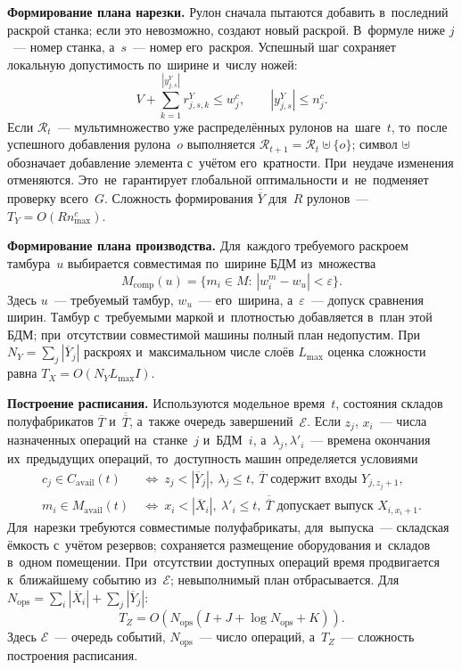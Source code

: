 \textbf{Формирование плана нарезки.} Рулон сначала пытаются добавить в~последний раскрой станка; если это невозможно, создают новый раскрой. В~формуле ниже $j$~--- номер станка, а~$s$~--- номер его~раскроя. Успешный шаг сохраняет локальную допустимость по~ширине и~числу ножей:
\[
V+\sum_{k=1}^{|y^Y_{j,s}|}r^Y_{j,s,k}\leq w^c_j,\qquad
|y^Y_{j,s}|\leq n^c_j.
\]
Если $\mathcal R_t$~--- мультимножество уже распределённых рулонов на~шаге~$t$, то~после успешного добавления рулона~$o$ выполняется $\mathcal R_{t+1}=\mathcal R_t\uplus\{o\}$; символ $\uplus$ обозначает добавление элемента с~учётом его~кратности. При~неудаче изменения отменяются. Это~не~гарантирует глобальной оптимальности и~не~подменяет проверку всего~$G$. Сложность формирования $\overline{\overline Y}$ для~$R$ рулонов~--- $T_Y=O(Rn^c_{\max})$.

\textbf{Формирование плана производства.} Для~каждого требуемого раскроем тамбура~$u$ выбирается совместимая по~ширине БДМ из~множества
\[
M_{\mathrm{comp}}(u)=
\{m_i\in M:\,|w_i^m-w_u|<\varepsilon\}.
\]
Здесь $u$~--- требуемый тамбур, $w_u$~--- его~ширина, а~$\varepsilon$~--- допуск сравнения ширин. Тамбур с~требуемыми маркой и~плотностью добавляется в~план этой БДМ; при~отсутствии совместимой машины полный план недопустим. При~$N_Y=\sum_j|\overline Y_j|$ раскроях и~максимальном числе слоёв $L_{\max}$ оценка сложности равна $T_X=O(N_YL_{\max}I)$.

\textbf{Построение расписания.} Используются модельное время~$t$, состояния складов полуфабрикатов $\overline T$ и~$\overline{\overline T}$, а~также очередь завершений~$\mathcal E$. Если $z_j$, $x_i$~--- числа назначенных операций на~станке~$j$ и~БДМ~$i$, а~$\lambda_j,\lambda'_i$~--- времена окончания их~предыдущих операций, то~доступность машин определяется условиями
\[
\begin{aligned}
c_j\in C_{\mathrm{avail}}(t)
&\ \Longleftrightarrow\
z_j<|\overline Y_j|,\ \lambda_j\leq t,\
\overline T\text{ содержит входы }Y_{j,z_j+1},\\
m_i\in M_{\mathrm{avail}}(t)
&\ \Longleftrightarrow\
x_i<|\overline X_i|,\ \lambda'_i\leq t,\
\overline{\overline T}\text{ допускает выпуск }X_{i,x_i+1}.
\end{aligned}
\]
Для~нарезки требуются совместимые полуфабрикаты, для~выпуска~--- складская ёмкость с~учётом резервов; сохраняется размещение оборудования и~складов в~одном помещении. При~отсутствии доступных операций время продвигается к~ближайшему событию из~$\mathcal E$; невыполнимый план отбрасывается. Для~$N_{\mathrm{ops}}=\sum_i|\overline X_i|+\sum_j|\overline Y_j|$:
\[
T_Z=O\!\left(N_{\mathrm{ops}}
(I+J+\log N_{\mathrm{ops}}+K)\right).
\]
Здесь $\mathcal E$~--- очередь событий, $N_{\mathrm{ops}}$~--- число операций, а~$T_Z$~--- сложность построения расписания.

